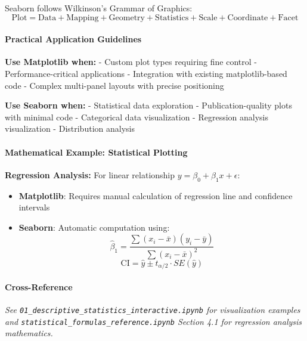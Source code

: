 \documentclass[11pt]{article}
\providecommand{\tightlist}{%
      \setlength{\itemsep}{0pt}\setlength{\parskip}{0pt}}
\begin{document}
Seaborn follows Wilkinson's Grammar of Graphics:
\[\text{Plot} = \text{Data} + \text{Mapping} + \text{Geometry} + \text{Statistics} + \text{Scale} + \text{Coordinate} + \text{Facet}\]

\paragraph{Practical Application
Guidelines}\label{practical-application-guidelines}

\textbf{Use Matplotlib when:} - Custom plot types requiring fine control
- Performance-critical applications - Integration with existing
matplotlib-based code - Complex multi-panel layouts with precise
positioning

\textbf{Use Seaborn when:} - Statistical data exploration -
Publication-quality plots with minimal code - Categorical data
visualization - Regression analysis visualization - Distribution
analysis

\paragraph{Mathematical Example: Statistical
Plotting}\label{mathematical-example-statistical-plotting}

\textbf{Regression Analysis:} For linear relationship
\(y = \beta_0 + \beta_1 x + \epsilon\):

\begin{itemize}
\tightlist
\item
  \textbf{Matplotlib}: Requires manual calculation of regression line
  and confidence intervals
\item
  \textbf{Seaborn}: Automatic computation using:
  \[\hat{\beta}_1 = \frac{\sum(x_i - \bar{x})(y_i - \bar{y})}{\sum(x_i - \bar{x})^2}\]
  \[\text{CI} = \hat{y} \pm t_{\alpha/2} \cdot SE(\hat{y})\]
\end{itemize}

\paragraph{Cross-Reference}\label{cross-reference}

\emph{See \texttt{01\_descriptive\_statistics\_interactive.ipynb} for
visualization examples and
\texttt{statistical\_formulas\_reference.ipynb} Section 4.1 for
regression analysis mathematics.}
\end{document}
